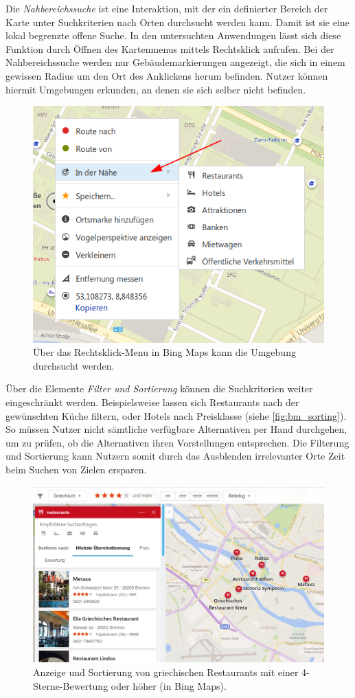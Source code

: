 Die \emph{Nahbereichssuche} ist eine Interaktion, mit der ein definierter Bereich der Karte unter Suchkriterien nach Orten durchsucht werden kann.
Damit ist sie eine lokal begrenzte offene Suche.
In den untersuchten Anwendungen lässt sich diese Funktion durch Öffnen des Kartenmenus mittels Rechtsklick aufrufen.
Bei der Nahbereichssuche werden nur Gebäudemarkierungen angezeigt, die sich in einem gewissen Radius um den Ort des Anklickens herum befinden.
Nutzer können hiermit Umgebungen erkunden, an denen sie sich selber nicht befinden.
\begin{figure}
	\includegraphics[width=0.485\linewidth]{figures/map-app_examples/bm_nearby}
	\caption{Über das Rechtsklick-Menu in Bing Maps kann die Umgebung durchsucht werden.}
	\label{fig:bm_nearby}
\end{figure}

Über die Elemente \emph{Filter und Sortierung} können die Suchkriterien weiter eingeschränkt werden.
Beispielsweise lassen sich Restaurants nach der gewünschten Küche filtern, oder Hotels nach Preisklasse (siehe \autoref{fig:bm_sorting}).
So müssen Nutzer nicht sämtliche verfügbare Alternativen per Hand durchgehen, um zu prüfen, ob die Alternativen ihren Vorstellungen entsprechen.
Die Filterung und Sortierung kann Nutzern somit durch das Ausblenden irrelevanter Orte Zeit beim Suchen von Zielen ersparen.
\begin{figure}
	\includegraphics[width=\linewidth]{figures/map-app_examples/bm_filter_sorting}
	\caption{Anzeige und Sortierung von griechischen Restaurants mit einer 4-Sterne-Bewertung oder höher (in Bing Maps).}
	\label{fig:bm_sorting}
\end{figure}

